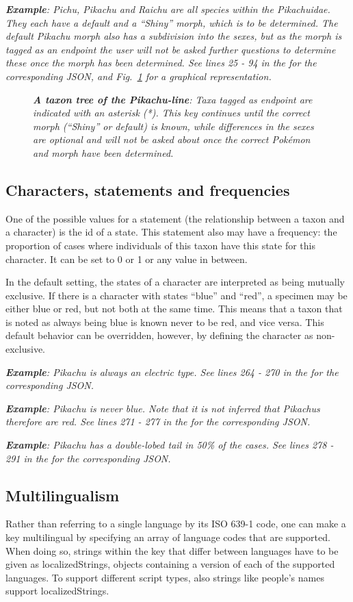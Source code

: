 \documentclass[10pt,letterpaper]{article}
\begin{document}
\textit{\textbf{Example}: Pichu, Pikachu and Raichu are all species within the Pikachuidae. They each have a default and a ``Shiny'' morph, which is to be determined. The default Pikachu morph also has a subdivision into the sexes, but as the morph is tagged as an endpoint the user will not be asked further questions to determine these once the morph has been determined. See lines 25 - 94 in the  for the corresponding JSON, and Fig.~\ref{fig3} for a graphical representation.}


\begin{figure}[!h]
  \caption{\textit{\textbf{A taxon tree of the Pikachu-line}:
Taxa tagged as endpoint are indicated with an asterisk (*). This key continues until the correct morph (``Shiny'' or default) is known, while differences in the sexes are optional and will not be asked about once the correct Pokémon and morph have been determined.
  }}
  \label{fig3}
\end{figure}
\subsection*{
Characters, statements and frequencies
}
One of the possible values for a statement (the relationship between a taxon and a character) is the id of a state. This statement also may have a frequency: the proportion of cases where individuals of this taxon have this state for this character. It can be set to 0 or 1 or any value in between.

In the default setting, the states of a character are interpreted as being mutually exclusive. If there is a character with states ``blue'' and ``red'', a specimen may be either blue or red, but not both at the same time. This means that a taxon that is noted as always being blue is known never to be red, and vice versa. This default behavior can be overridden, however, by defining the character as non-exclusive.

\textit{\textbf{Example}: Pikachu is always an electric type. See lines 264 - 270 in the  for the corresponding JSON.}

\textit{\textbf{Example}: Pikachu is never blue. Note that it is not inferred that Pikachus therefore are red. See lines 271 - 277 in the  for the corresponding JSON.}

\textit{\textbf{Example}: Pikachu has a double-lobed tail in 50\% of the cases. See lines 278 - 291 in the  for the corresponding JSON.}
\subsection*{
Multilingualism
}
Rather than referring to a single language by its ISO 639-1 code, one can make a key multilingual by specifying an array of language codes that are supported. When doing so, strings within the key that differ between languages have to be given as localizedStrings, objects containing a version of each of the supported languages. To support different script types, also strings like people's names support localizedStrings.
\end{document}
